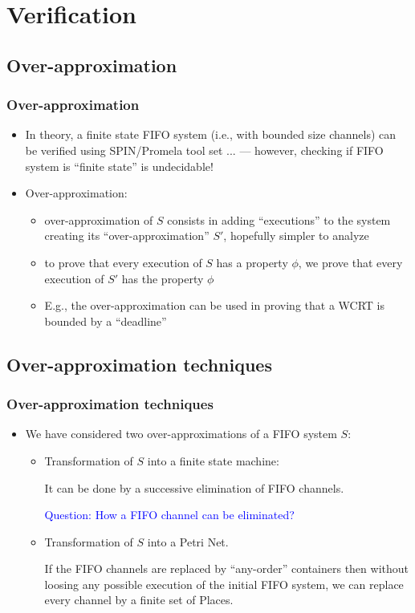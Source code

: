 \documentclass[utf8]{beamer}
\newcommand{\mypause}{\pause}
\begin{document}
\section{Verification}
\subsection{Over-approximation}
\begin{frame}
  \frametitle{Over-approximation}
  \begin{itemize}
  \item In theory, a finite state FIFO system (i.e., with bounded size
    channels) can be verified using SPIN/Promela tool set ... \mypause
    --- however, checking if FIFO system is ``finite state'' is
    undecidable! \mypause
  \item Over-approximation:
    \begin{itemize}
    \item over-approximation of $S$ consists in adding ``executions''
      to the system creating its ``over-approximation'' $S'$,
      hopefully simpler to analyze \mypause
    \item to prove that every execution of $S$ has a property $\phi$,
      we prove that  every execution of $S'$ has the property $\phi$ \mypause
    \item E.g., the over-approximation can be used in proving that a
      WCRT is bounded by a ``deadline''
    \end{itemize}
  \end{itemize}

\end{frame}

\subsection{Over-approximation techniques}
\begin{frame}
  \frametitle{Over-approximation techniques}
  \begin{itemize}
  \item We have considered two over-approximations of a FIFO system
    $S$: \mypause
    \begin{itemize}
    \item Transformation of $S$ into a finite state machine: \mypause

      It can be done by a successive elimination of FIFO channels. \mypause

      \textcolor{blue}{Question: How a FIFO channel can be eliminated?}

      \mypause
    \item Transformation of $S$ into a Petri Net. \mypause
      
      If the FIFO channels are replaced by ``any-order'' containers
      then without loosing any possible execution of the initial FIFO
      system, we can replace every channel by a finite set of Places.
    \end{itemize}
  \end{itemize}
\end{frame}
\end{document}
